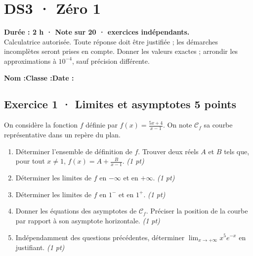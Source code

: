 \mxnewpage{}\label{sujet:4-1}

\section*{DS3 · Zéro 1}


\textbf{Durée : 2 h · Note sur 20 ·  exercices indépendants.}\\Calculatrice autorisée. Toute réponse doit être justifiée ; les démarches incomplètes seront prises en compte. Donner les valeurs exactes ; arrondir les approximations à $10^{-4}$, sauf précision différente.

\smallskip\textbf{Nom :}\enspace\dotfill\quad\textbf{Classe :}\enspace\dotfill\quad\textbf{Date :}\enspace\dotfill

\subsection*{Exercice 1 · Limites et asymptotes \hfill 5 points}On considère la fonction $f$ définie par $f(x)=\frac{5x+4}{x-1}$. On note $\mathcal C_f$ sa courbe représentative dans un repère du plan.

\begin{enumerate}

\item Déterminer l'ensemble de définition de $f$. Trouver deux réels $A$ et $B$ tels que, pour tout $x\ne1$, $f(x)=A+\frac B{x-1}$. \hfill\textit{(1 pt)}

\item Déterminer les limites de $f$ en $-\infty$ et en $+\infty$. \hfill\textit{(1 pt)}

\item Déterminer les limites de $f$ en $1^-$ et en $1^+$. \hfill\textit{(1 pt)}

\item Donner les équations des asymptotes de $\mathcal C_f$. Préciser la position de la courbe par rapport à son asymptote horizontale. \hfill\textit{(1 pt)}

\item Indépendamment des questions précédentes, déterminer $\displaystyle\lim_{x\to+\infty}x^{5}e^{-x}$ en justifiant. \hfill\textit{(1 pt)}

\end{enumerate}

